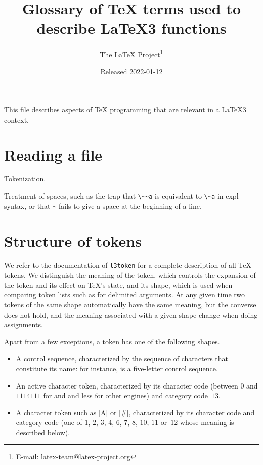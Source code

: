 \documentclass{l3doc}
\title{%
  Glossary of \TeX{} terms used to describe \LaTeX3 functions%
}
\author{%
  The \LaTeX{} Project\thanks
    {%
      E-mail:
      \href{mailto:latex-team@latex-project.org}%
        {latex-team@latex-project.org}%
    }%
}
\date{Released 2022-01-12}
\begin{document}
\maketitle

This file describes aspects of \TeX{} programming that are relevant in a
\LaTeX3 context.

\section{Reading a file}

Tokenization.

Treatment of spaces, such as the trap that \verb|\~~a| is equivalent to
\verb|\~a| in expl syntax, or that \verb|~| fails to give a space at the
beginning of a line.

\section{Structure of tokens}

We refer to the documentation of \texttt{l3token} for a complete
description of all \TeX{} tokens.  We distinguish the meaning of the
token, which controls the expansion of the token and its effect on
\TeX{}'s state, and its shape, which is used when comparing token lists
such as for delimited arguments.  At any given time two tokens of the
same shape automatically have the same meaning, but the converse does
not hold, and the meaning associated with a given shape change when
doing assignments.

Apart from a few exceptions, a token has one of the following shapes.
\begin{itemize}
  \item A control sequence, characterized by the sequence of characters
    that constitute its name: for instance,  is a five-letter
    control sequence.
  \item An active character token, characterized by its character code
    (between $0$ and $1114111$ for \LuaTeX{} and \XeTeX{} and less for
    other engines) and category code~$13$.
  \item A character token such as |A| or |#|, characterized by its
    character code and category code (one of $1$, $2$, $3$, $4$, $6$,
    $7$, $8$, $10$, $11$ or~$12$ whose meaning is described below).
\end{itemize}
\end{document}
